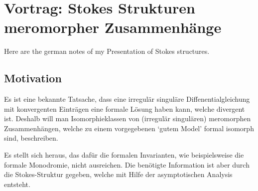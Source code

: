 \chapter{Vortrag: Stokes Strukturen meromorpher Zusammenhänge}
Here are the german notes of my Presentation of Stokes structures.
\setcounter{section}{-1} \section{Motivation} %

Es ist eine bekannte Tatsache, dass eine irregulär singuläre
Diffenentialgleichung mit konvergenten Einträgen eine formale Lösung haben
kann, welche divergent ist.  Deshalb will man Isomorphieklassen von (irregulär
singulären) meromorphen Zusammenhängen, welche zu einem vorgegebenen `gutem
Model' formal isomorph sind, beschreiben.

Es stellt sich heraus, das dafür die formalen Invarianten, wie beispielsweise
die formale Monodromie, nicht ausreichen. Die benötigte Information ist aber
durch die Stokes-Struktur gegeben, welche mit Hilfe der asymptotischen Analysis
entsteht.

